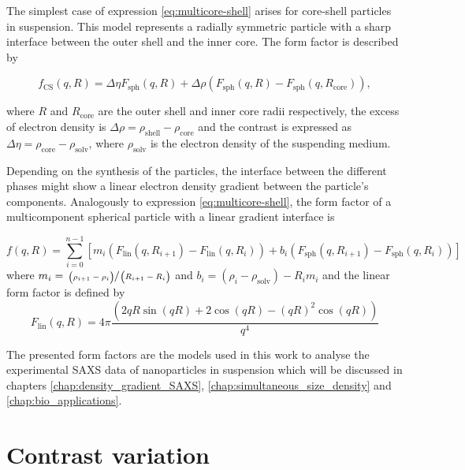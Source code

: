 The simplest case of expression \ref{eq:multicore-shell} arises for core-shell particles in suspension. This model represents a radially symmetric particle with a sharp interface between the outer shell and the inner core. The form factor is described by

\begin{equation}
        \label{eq:ff_cs}
	f_{\text{CS}}(q,R)=  \Delta\eta F_{\text{sph}}(q,R) +  \Delta\rho\left( F_{\text{sph}}(q,R)-F_{\text{sph}}(q,R_{\text{core}}) \right) ,
\end{equation}

where \(R \) and \(R_{\text{core}} \)  are the outer shell and inner core radii respectively, the excess of electron density is \(\Delta\rho=\rho_{\text{shell}}-\rho_{\text{core}}\) and the contrast is expressed as \(\Delta\eta=\rho_{\text{core}}-\rho_{\text{solv}}\), where $\rho_{\text{solv}}$ is the electron density of the suspending medium.

Depending on the synthesis of the particles, the interface between the different phases might show a linear electron density gradient between the particle's components. Analogously to expression \ref{eq:multicore-shell}, the form factor of a multicomponent spherical particle with a linear gradient interface is

\begin{equation}
f\left(q,R \right) = \sum_{i=0}^{n-1}\left[m_i \left( F_{\text{lin}}(q,R_{i+1})-F_{\text{lin}}(q,R_{i}) \right) +b_i \left( F_{\text{sph}}(q,R_{i+1})-F_{\text{sph}}(q,R_{i}) \right) \right]
\end{equation}
where $m_i=\sfrac{\left( \rho_{i+1}-\rho_{i} \right)}{\left( R_{i+1}-R_{i} \right)}$ and $b_i=\left( \rho_i-\rho_{\text{solv}} \right)-R_im_i$ and the linear form factor is defined by
\begin{equation}
F_{\text{lin}}(q,R) = 4\pi\frac{ \left( 2qR\sin(qR)+2\cos(qR)-(qR)^2\cos(qR) \right)}{q^4}
\end{equation}

The presented form factors are the models used in this work to analyse the experimental SAXS data of nanoparticles in suspension which will be discussed in chapters \ref{chap:density_gradient_SAXS}, \ref{chap:simultaneous_size_density} and \ref{chap:bio_applications}.

\section{Contrast variation}
\label{sec:contrast_variation_theory}

